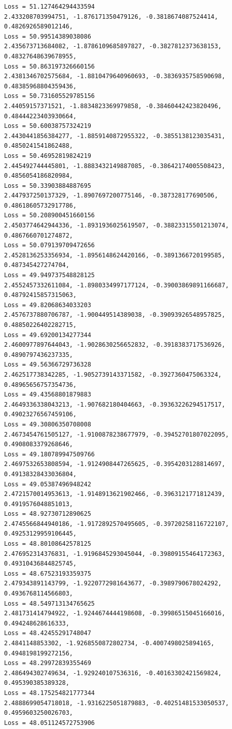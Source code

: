 \documentclass[11pt]{article}
\begin{document}
\begin{Verbatim}[commandchars=\\\{\}]
Loss = 51.127464294433594
2.433208703994751, -1.876171350479126, -0.3818674087524414, 0.4826926589012146,
Loss = 50.99514389038086
2.435673713684082, -1.8786109685897827, -0.3827812373638153,
0.48327648639678955,
Loss = 50.863197326660156
2.4381346702575684, -1.8810479640960693, -0.3836935758590698,
0.48385968804359436,
Loss = 50.731605529785156
2.44059157371521, -1.8834823369979858, -0.38460442423820496,
0.48444223403930664,
Loss = 50.60038757324219
2.4430441856384277, -1.8859140872955322, -0.3855138123035431,
0.4850241541862488,
Loss = 50.46952819824219
2.445492744445801, -1.8883432149887085, -0.38642174005508423,
0.4856054186820984,
Loss = 50.33903884887695
2.447937250137329, -1.8907697200775146, -0.387328177690506, 0.48618605732917786,
Loss = 50.208900451660156
2.4503774642944336, -1.8931936025619507, -0.38823315501213074,
0.4867660701274872,
Loss = 50.079139709472656
2.4528136253356934, -1.8956148624420166, -0.3891366720199585, 0.487345427274704,
Loss = 49.949737548828125
2.4552457332611084, -1.8980334997177124, -0.39003869891166687,
0.48792415857315063,
Loss = 49.82068634033203
2.4576737880706787, -1.900449514389038, -0.39093926548957825,
0.48850226402282715,
Loss = 49.69200134277344
2.4600977897644043, -1.9028630256652832, -0.3918383717536926,
0.4890797436237335,
Loss = 49.56366729736328
2.462517738342285, -1.9052739143371582, -0.3927360475063324,
0.48965656757354736,
Loss = 49.43568801879883
2.4649336338043213, -1.907682180404663, -0.39363226294517517,
0.49023276567459106,
Loss = 49.30806350708008
2.4673454761505127, -1.9100878238677979, -0.39452701807022095,
0.4908083379268646,
Loss = 49.180789947509766
2.4697532653808594, -1.9124908447265625, -0.3954203128814697,
0.49138328433036804,
Loss = 49.05387496948242
2.4721570014953613, -1.9148913621902466, -0.3963121771812439,
0.4919576048851013,
Loss = 48.92730712890625
2.4745566844940186, -1.9172892570495605, -0.39720258116722107,
0.49253129959106445,
Loss = 48.80108642578125
2.476952314376831, -1.9196845293045044, -0.39809155464172363,
0.49310436844825745,
Loss = 48.67523193359375
2.479343891143799, -1.9220772981643677, -0.3989790678024292, 0.4936768114566803,
Loss = 48.549713134765625
2.481731414794922, -1.9244674444198608, -0.39986515045166016, 0.494248628616333,
Loss = 48.42455291748047
2.4841148853302, -1.9268550872802734, -0.4007498025894165, 0.4948198199272156,
Loss = 48.29972839355469
2.486494302749634, -1.929240107536316, -0.40163302421569824, 0.495390385389328,
Loss = 48.175254821777344
2.4888699054718018, -1.9316225051879883, -0.40251481533050537,
0.4959603250026703,
Loss = 48.051124572753906

\end{Verbatim}
\end{document}

